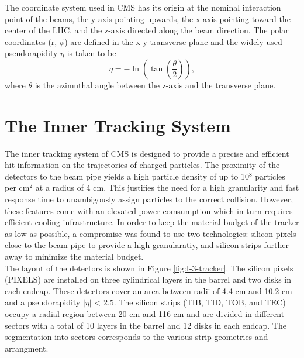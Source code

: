     The coordinate system used in CMS has its origin at the nominal interaction point of the beams, the y-axis pointing upwards, the x-axis pointing toward the center of the LHC, and the z-axis directed along the beam direction. The polar coordinates (r, $ \phi $) are defined in the x-y transverse plane and the widely used pseudorapidity $ \eta $ is taken to be
    \begin{equation}
      \eta = - \ln\left( \tan\left( \frac{\theta}{2} \right) \right) ,
    \end{equation}
    where $ \theta $ is the azimuthal angle between the z-axis and the transverse plane.

  \section{The Inner Tracking System}

    The inner tracking system of CMS is designed to provide a precise and efficient hit information on the trajectories of charged particles.  The proximity of the detectors to the beam pipe yields a high particle density of up to 10$^8$ particles per cm$^2$ at a radius of 4 cm. This justifies the need for a high granularity and fast response time to unambigously assign particles to the correct collision. However, these features come with an elevated power comsumption which in turn requires efficient cooling infrastructure. In order to keep the material budget of the tracker as low as possible, a compromise was found to use two technologies: silicon pixels close to the beam pipe to provide a high granularatiy, and silicon strips further away to minimize the material budget. \\

    The layout of the detectors is shown in Figure \ref{fig:I-3-tracker}. The silicon pixels (PIXELS) are installed on three cylindrical layers in the barrel and two disks in each endcap. These detectors cover an area between radii of 4.4 cm and 10.2 cm and a pseudorapidity $|\eta|$ < 2.5. The silicon strips (TIB, TID, TOB, and TEC) occupy a radial region between 20 cm and 116 cm and are divided in different sectors with a total of 10 layers in the barrel and 12 disks in each endcap. The segmentation into sectors corresponds to the various strip geometries and arrangment. \\

